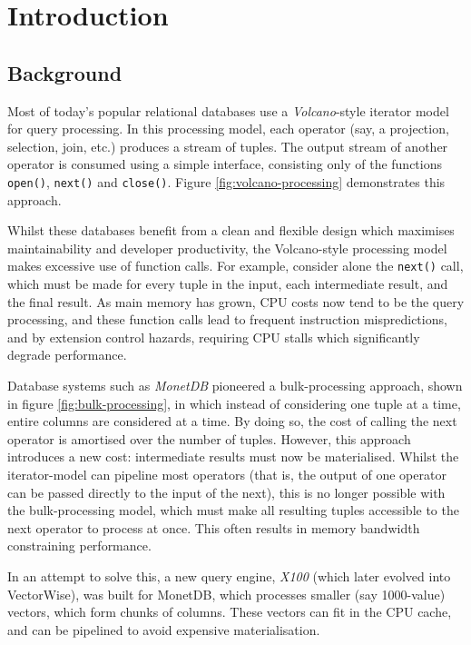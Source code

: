 \chapter{Introduction}

\section{Background}

Most of today's popular relational databases use a \emph{Volcano}-style iterator model \cite{Graefe:1994:VEP:627290.627558} for query processing. In this processing model, each operator (say, a projection, selection, join, etc.) produces a stream of tuples. The output stream of another operator is consumed using a simple interface, consisting only of the functions \texttt{open()}, \texttt{next()} and \texttt{close()}. Figure \ref{fig:volcano-processing} demonstrates this approach.

Whilst these databases benefit from a clean and flexible design which maximises maintainability and developer productivity, the Volcano-style processing model makes excessive use of function calls. For example, consider alone the \texttt{next()} call, which must be made for every tuple in the input, each intermediate result, and the final result. As main memory has grown, CPU costs now tend to be the query processing, and these function calls lead to frequent instruction mispredictions, and by extension control hazards, requiring CPU stalls which significantly degrade performance.

Database systems such as \emph{MonetDB} \cite{Boncz:2008:BMW:1409360.1409380} pioneered a bulk-processing approach, shown in figure \ref{fig:bulk-processing}, in which instead of considering one tuple at a time, entire columns are considered at a time. By doing so, the cost of calling the next operator is amortised over the number of tuples. However, this approach introduces a new cost: intermediate results must now be materialised. Whilst the iterator-model can pipeline most operators (that is, the output of one operator can be passed directly to the input of the next), this is no longer possible with the bulk-processing model, which must make all resulting tuples accessible to the next operator to process at once. This often results in memory bandwidth constraining performance.

In an attempt to solve this, a new query engine, \emph{X100} \cite{DBLP:conf/cidr/BonczZN05} (which later evolved into VectorWise), was built for MonetDB, which processes smaller (say 1000-value) vectors, which form chunks of columns. These vectors can fit in the CPU cache, and can be pipelined to avoid expensive materialisation.

